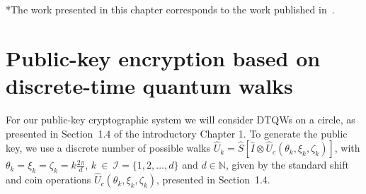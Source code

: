 \vfill

\begin{center}
 *The work presented in this chapter corresponds to the work published in~\cite{vla:rod:mat:pau:sou:15}.
\end{center}

\newpage

\section{Public-key encryption based on discrete-time quantum walks}
\label{sec:pkscheme}
For our public-key cryptographic system we will consider DTQWs on a circle, as presented in Section~1.4 of the introductory Chapter 1. To generate the public key, we use a discrete number of possible walks $\hat{U}_k = \hat{S} [ \hat{I} \otimes \hat{U}_c (\theta_k, \xi_k, \zeta_k)]$, with $\theta_k = \xi_k = \zeta_k = k \frac{2\pi}{d}$, $k~\in~\mathcal I=\{1,2,\ldots,d\}$ and $d \in \mathbb N$, given by the standard shift and coin operations $\hat{U}_c (\theta_k, \xi_k, \zeta_k)$, presented in Section~1.4.


